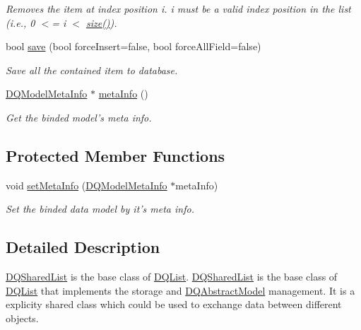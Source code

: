 \begin{DoxyCompactItemize}
\begin{DoxyCompactList}\small\item\em Removes the item at index position i. i must be a valid index position in the list (i.e., 0 $<$= i $<$ \hyperlink{classDQSharedList_a7686c471ce10b212b120ac2676d466e8}{size()}). \item\end{DoxyCompactList}\item 
bool \hyperlink{classDQSharedList_ab64026c377a6bd43663a39f684c2eff6}{save} (bool forceInsert=false, bool forceAllField=false)
\begin{DoxyCompactList}\small\item\em Save all the contained item to database. \item\end{DoxyCompactList}\item 
\hyperlink{classDQModelMetaInfo}{DQModelMetaInfo} $\ast$ \hyperlink{classDQSharedList_aa7d6dd862ef0d3753784e3bdf35ddea3}{metaInfo} ()
\begin{DoxyCompactList}\small\item\em Get the binded model's meta info. \item\end{DoxyCompactList}\end{DoxyCompactItemize}
\subsection*{Protected Member Functions}
\begin{DoxyCompactItemize}
\item 
\hypertarget{classDQSharedList_a85ede6de886734e518490c9679b0c285}{
void \hyperlink{classDQSharedList_a85ede6de886734e518490c9679b0c285}{setMetaInfo} (\hyperlink{classDQModelMetaInfo}{DQModelMetaInfo} $\ast$metaInfo)}
\label{classDQSharedList_a85ede6de886734e518490c9679b0c285}

\begin{DoxyCompactList}\small\item\em Set the binded data model by it's meta info. \item\end{DoxyCompactList}\end{DoxyCompactItemize}


\subsection{Detailed Description}
\hyperlink{classDQSharedList}{DQSharedList} is the base class of \hyperlink{classDQList}{DQList}. \hyperlink{classDQSharedList}{DQSharedList} is the base class of \hyperlink{classDQList}{DQList} that implements the storage and \hyperlink{classDQAbstractModel}{DQAbstractModel} management. It is a explicity shared class which could be used to exchange data between different objects.

